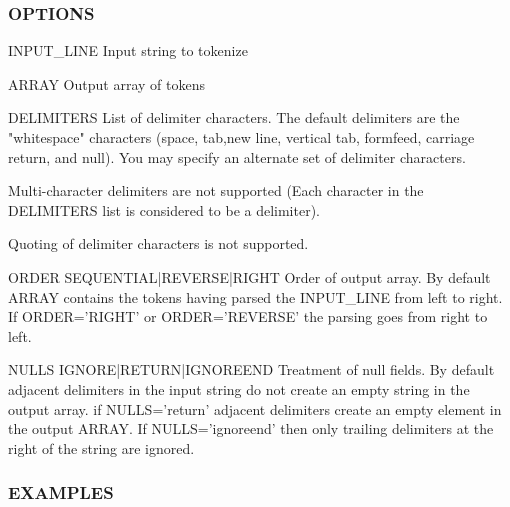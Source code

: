 \subsubsection*{O\+P\+T\+I\+O\+NS}

\begin{DoxyVerb}INPUT_LINE  Input string to tokenize

ARRAY       Output array of tokens

DELIMITERS  List of delimiter characters.
            The default delimiters are the "whitespace" characters
            (space, tab,new line, vertical tab, formfeed, carriage
            return, and null). You may specify an alternate set of
            delimiter characters.

            Multi-character delimiters are not supported (Each
            character in the DELIMITERS list is considered to be
            a delimiter).

            Quoting of delimiter characters is not supported.

ORDER SEQUENTIAL|REVERSE|RIGHT  Order of output array.
            By default ARRAY contains the tokens having parsed
            the INPUT_LINE from left to right. If ORDER='RIGHT'
            or ORDER='REVERSE' the parsing goes from right to left.

NULLS IGNORE|RETURN|IGNOREEND  Treatment of null fields.
            By default adjacent delimiters in the input string
            do not create an empty string in the output array. if
            NULLS='return' adjacent delimiters create an empty element
            in the output ARRAY. If NULLS='ignoreend' then only
            trailing delimiters at the right of the string are ignored.
\end{DoxyVerb}


\subsubsection*{E\+X\+A\+M\+P\+L\+ES}

